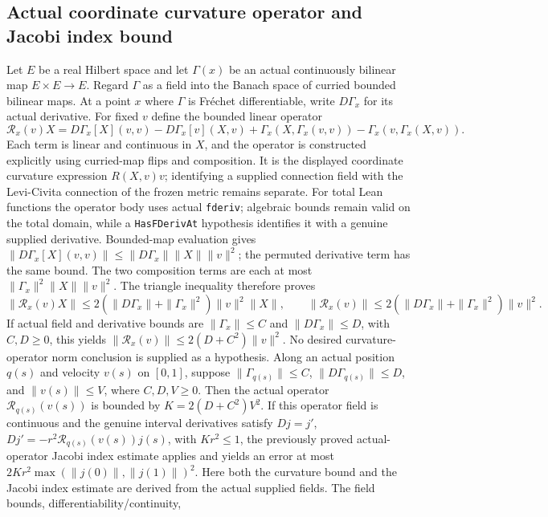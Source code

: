\documentclass[11pt]{article}
\theoremstyle{definition}
\theoremstyle{remark}
\numberwithin{equation}{section}
\begin{document}
\subsection{Actual coordinate curvature operator and Jacobi index bound}
\label{expanded:coordinate-curvature-operator}
Let $E$ be a real Hilbert space and let $\Gamma(x)$ be an actual continuously
bilinear map $E\times E\to E$. Regard $\Gamma$ as a field into the Banach
space of curried bounded bilinear maps. At a point $x$ where $\Gamma$ is
Fr\'echet differentiable, write $D\Gamma_x$ for its actual derivative. For
fixed $v$ define the bounded linear operator
\[
 \mathcal R_x(v)X=D\Gamma_x[X](v,v)-D\Gamma_x[v](X,v)
       +\Gamma_x(X,\Gamma_x(v,v))-\Gamma_x(v,\Gamma_x(X,v)).
\]
Each term is linear and continuous in $X$, and the operator is constructed
explicitly using curried-map flips and composition. It is the displayed
coordinate curvature expression $R(X,v)v$; identifying a supplied connection
field with the Levi-Civita connection of the frozen metric remains separate.
For total Lean functions the operator body uses actual \texttt{fderiv};
algebraic bounds remain valid on the total domain, while a
\texttt{HasFDerivAt} hypothesis identifies it with a genuine supplied derivative.
\label{expanded:coordinate-curvature-norm}
Bounded-map evaluation gives
$\|D\Gamma_x[X](v,v)\|\le\|D\Gamma_x\|\|X\|\|v\|^2$;
the permuted derivative term has the same bound. The two composition terms
are each at most $\|\Gamma_x\|^2\|X\|\|v\|^2$.
The triangle inequality therefore proves
\[
 \|\mathcal R_x(v)X\|\le
   2(\|D\Gamma_x\|+\|\Gamma_x\|^2)\|v\|^2\|X\|,
 \qquad
 \|\mathcal R_x(v)\|\le2(\|D\Gamma_x\|+\|\Gamma_x\|^2)\|v\|^2.
\]
If actual field and derivative bounds are $\|\Gamma_x\|\le C$ and
$\|D\Gamma_x\|\le D$, with $C,D\ge0$, this yields
$\|\mathcal R_x(v)\|\le2(D+C^2)\|v\|^2$. No desired curvature-operator
norm conclusion is supplied as a hypothesis.
\label{expanded:coordinate-curvature-jacobi-index}
Along an actual position $q(s)$ and velocity $v(s)$ on $[0,1]$, suppose
$\|\Gamma_{q(s)}\|\le C$, $\|D\Gamma_{q(s)}\|\le D$, and
$\|v(s)\|\le V$, where $C,D,V\ge0$.
Then the actual operator $\mathcal R_{q(s)}(v(s))$ is bounded by
$K=2(D+C^2)V^2$. If this operator field is continuous and the genuine
interval derivatives satisfy $Dj=j'$,
$Dj'=-r^2\mathcal R_{q(s)}(v(s))j(s)$, with $Kr^2\le1$,
the previously proved actual-operator Jacobi index estimate applies and yields
an error at most $2Kr^2\max(\|j(0)\|,\|j(1)\|)^2$.
Here both the curvature bound and the Jacobi index estimate are derived from
the actual supplied fields. The field bounds, differentiability/continuity,
\end{document}
